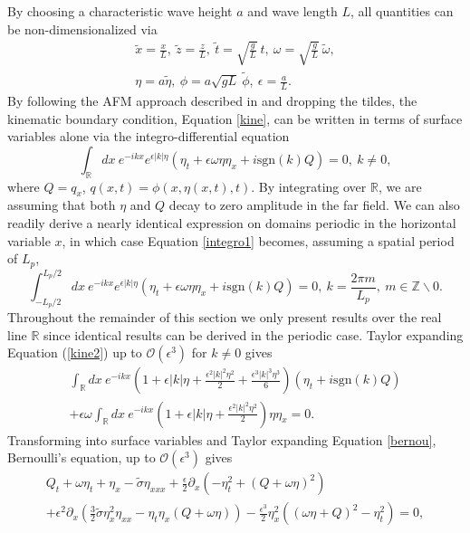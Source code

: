 \documentclass{JFM_Style/jfm}
\newcommand{\pd}{\partial}
\begin{document}
By choosing a characteristic wave height $a$ and wave length $L$, all quantities can be non-dimensionalized via 
\begin{align*}
\tilde{x} = \frac{x}{L}, ~\tilde{z} = \frac{z}{L}, ~ \tilde{t} = \sqrt{\frac{g}{L}}~t, ~\omega = \sqrt{\frac{g}{L}}~\tilde{\omega}, \\
\eta = a \tilde{\eta}, ~ \phi  = a\sqrt{gL}~\tilde{\phi} , ~ \epsilon = \frac{a}{L}.
\end{align*}
By following the AFM approach described in \cite{afm,ashton} and dropping the tildes, the kinematic boundary condition, Equation \eqref{kine}, can be written in terms of surface variables alone via the integro-differential equation 
\begin{equation}
\int_{\mathbb{R}}dx~e^{-ikx}e^{\epsilon|k|\eta}\left(\eta_{t} +
  \epsilon \omega \eta \eta_{x} + i \mbox{sgn}(k)Q \right) = 0, ~
k\neq 0,
\label{kine2}
\end{equation}
where $Q=q_{x}$, $q(x,t) = \phi(x,\eta(x,t),t)$.  By integrating over $\mathbb{R}$, we are assuming that both $\eta$ and $Q$ decay to zero amplitude in the far field.  We can also readily derive a nearly identical expression on domains periodic in the horizontal variable $x$, in which case Equation \eqref{integro1} becomes, assuming a spatial period of $L_{p}$,
\begin{equation}
\int_{-L_{p}/2}^{L_{p}/2}dx~e^{-ikx}e^{\epsilon|k|\eta}\left(\eta_{t} +
  \epsilon \omega \eta \eta_{x} + i \mbox{sgn}(k)Q \right) = 0, ~ k = \frac{2\pi m}{L_{p}}, ~ m\in \mathbb{Z}\backslash{0}.
\label{integro1per}
\end{equation}
Throughout the remainder of this section we only present results over the real line $\mathbb{R}$ since identical results can be derived in the periodic case.  
Taylor expanding Equation (\ref{kine2}) up to $\mathcal{O}(\epsilon^3)$ for $k\neq 0$ gives  
\begin{multline}
\int_{\mathbb{R}}dx~e^{-ikx}\left(1 + \epsilon |k|\eta + \frac{\epsilon^{2}|k|^{2}\eta^{2}}{2} + \frac{\epsilon^{3}|k|^{3}\eta^{3}}{6}\right)\left(\eta_{t} + i \mbox{sgn}(k)Q \right) \\
+ \epsilon \omega \int_{\mathbb{R}}dx~e^{-ikx}\left(1 + \epsilon |k|\eta + \frac{\epsilon^{2}|k|^{2}\eta^{2}}{2}\right) \eta \eta_{x} = 0.
\label{integro1}
\end{multline}
Transforming into surface variables and Taylor expanding Equation \eqref{bernou}, Bernoulli's equation, up to $\mathcal{O}(\epsilon^3)$ gives
\begin{multline}
Q_{t} + \omega \eta_{t} + \eta_{x} - \tilde{\sigma}\eta_{xxx} + \frac{\epsilon}{2}\pd_{x}\left(-\eta_{t}^{2} + (Q+\omega \eta)^{2} \right)\\
+ \epsilon^{2}\pd_{x}\left( \frac{3}{2}\tilde{\sigma}\eta_{x}^{2}\eta_{xx} - \eta_{t}\eta_{x} \left(Q  + \omega \eta \right) \right) - \frac{\epsilon^{3}}{2}\eta_{x}^{2}\left((\omega\eta+Q)^{2}-\eta_{t}^{2}\right) = 0, 
\label{berexp}
\end{multline}
\end{document}
